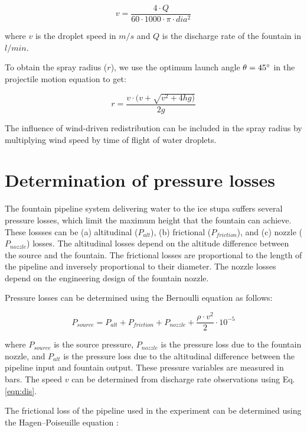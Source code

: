 \documentclass[tc, manuscript]{copernicus}
\begin{document}
\begin{equation}
	\label{eqn:dis}
v = \frac{4 \cdot Q}{60 \cdot 1000 \cdot \pi \cdot dia^2}
\end{equation}

where $v$ is the droplet speed in $m/s$ and $Q$ is the discharge rate of the fountain in $l/min$.

To obtain the spray radius ($r$), we use the optimum launch angle $\theta = 45 ^{\circ}$ in the projectile motion
equation to get:

\begin{equation}
  \label{eqn:radf}
  r = \frac{v \cdot(v + \sqrt{v^2 + 4hg)}}{2g}
\end{equation}

The influence of wind-driven redistribution can be included in the spray radius by multiplying wind speed
by time of flight of water droplets.

\section{Determination of pressure losses} \label{sec:p_loss}

The fountain pipeline system delivering water to the ice stupa suffers several pressure losses, which
limit the maximum height that the fountain can achieve. These lossses can be (a)
altitudinal ($P_{alt}$), (b) frictional ($P_{friction}$), and (c) nozzle ($P_{nozzle}$) losses. The altitudinal
losses depend on the altitude difference between the source and the fountain. The frictional losses are
proportional to the length of the pipeline and inversely proportional to their diameter. The nozzle losses
depend on the engineering design of the fountain nozzle.

Pressure losses can be determined using the Bernoulli equation as follows:

\begin{equation}
  \label{eqn:pressure}
  P_{source} = P_{alt} + P_{friction} + P_{nozzle} + \frac{\rho \cdot v^2}{2} \cdot 10 ^{-5}
\end{equation}

where $P_{source}$ is the source pressure, $P_{nozzle}$ is the pressure loss due to the fountain nozzle, and
$P_{alt}$ is the pressure loss due to the altitudinal difference between the pipeline input and fountain output. These pressure variables are measured in bars.  The speed $v$ can be determined from discharge rate
observations using Eq. \ref{eqn:dis}. 

The frictional loss of the pipeline used in the experiment can be determined using the 
Hagen–Poiseuille equation \citep{poiseuilleExperimentalInvestigationsFlow1847}:  
\end{document}
